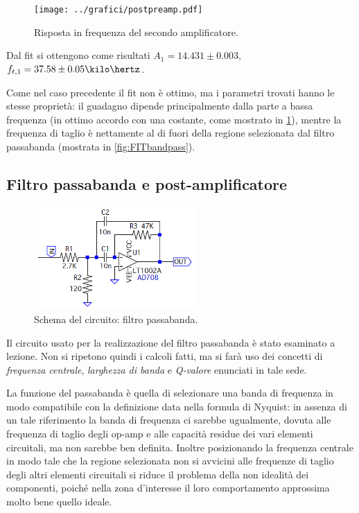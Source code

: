 \documentclass[a4paper,10pt]{article}
\begin{document}
\vspace*{-8pt}
\begin{figure}[H]
	\centering
	\texttt{[image: ../grafici/postpreamp.pdf]}
	\vspace*{-10pt}
	\caption{Risposta in frequenza del secondo amplificatore.}
	\label{fig:postpreamp}
\end{figure}
\vspace*{-10pt}

Dal fit si ottengono come risultati $A_1 = 14.431\pm0.003$, $f_{t,1} = 37.58\pm0.05 \kilo\hertz$.

Come nel caso precedente il fit non è ottimo, ma i parametri trovati hanno le stesse proprietà: il guadagno dipende principalmente dalla parte a bassa frequenza (in ottimo accordo con una costante, come mostrato in \cref{fig:postpreamp}), mentre la frequenza di taglio è nettamente al di fuori della regione selezionata dal filtro passabanda (mostrata in \cref{fig:FITbandpass}).

\subsection{Filtro passabanda e post-amplificatore}
\label{sec:bandpass}

\begin{figure}
	\vspace{-10pt}
	\centering
	\includegraphics[width=0.55\textwidth]{../grafici/Bandpass.png}
	\vspace{-12pt}
	\caption{Schema del circuito: filtro passabanda.}
	\label{fig:bandpass}
	\vspace{-6pt}
\end{figure}

Il circuito usato per la realizzazione del filtro passabanda è stato esaminato a lezione. Non si ripetono quindi i calcoli fatti, ma si farà uso dei concetti di \textit{frequenza centrale}, \textit{larghezza di banda} e \textit{Q-valore} enunciati in tale sede.

La funzione del passabanda è quella di selezionare una banda di frequenza in modo compatibile con la definizione data nella formula di Nyquist: in assenza di un tale riferimento la banda di frequenza ci sarebbe ugualmente, dovuta alle frequenza di taglio degli op-amp e alle capacità residue dei vari elementi circuitali, ma non sarebbe ben definita.
Inoltre posizionando la frequenza centrale in modo tale che la regione selezionata non si avvicini alle frequenze di taglio degli altri elementi circuitali si riduce il problema della non idealità dei componenti, poiché nella zona d'interesse il loro comportamento approssima molto bene quello ideale.
\newline
\end{document}
